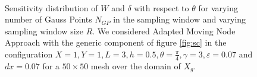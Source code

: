 \begin{figure}[ht]
\centering
{}%
     \\
    \caption{Sensitivity distribution of $W$ and $\delta$ with respect to $\theta$ for varying number of Gauss Points $N_{GP}$ in the sampling window and varying sampling window size $R$. We considered Adapted Moving Node Approach with the generic component of figure \ref{fig:sc} in the configuration  $X=1,Y=1,L=3,h=0.5,\theta=\frac{\pi}{4}, \gamma=3, \varepsilon=0.07$ and  $dx=0.07$ for a $50\times50$ mesh over the domain of $X_g$.}%
    \label{fig:sensT}%
\end{figure}

